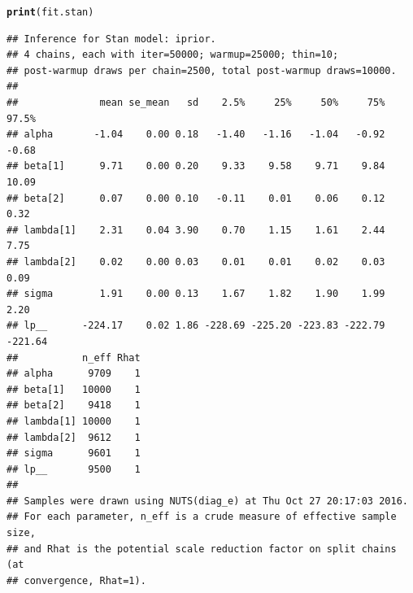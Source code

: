 \documentclass{beamer}\usepackage[]{graphicx}\usepackage[]{color}
\makeatletter
\newcommand{\hlstd}[1]{\textcolor[rgb]{0.345,0.345,0.345}{#1}}%
\newcommand{\hlkwd}[1]{\textcolor[rgb]{0.737,0.353,0.396}{\textbf{#1}}}%
\newenvironment{kframe}{%
 \def\at@end@of@kframe{}%
 \ifinner\ifhmode%
  \def\at@end@of@kframe{\end{minipage}}%
  \begin{minipage}{\columnwidth}%
 \fi\fi%
 \def\FrameCommand##1{\hskip\@totalleftmargin \hskip-\fboxsep
 \colorbox{shadecolor}{##1}\hskip-\fboxsep
     \hskip-\linewidth \hskip-\@totalleftmargin \hskip\columnwidth}%
 \MakeFramed {\advance\hsize-\width
   \@totalleftmargin\z@ \linewidth\hsize
   \@setminipage}}%
 {\par\unskip\endMakeFramed%
 \at@end@of@kframe}
\newenvironment{knitrout}{}{} %
\makeatother
\begin{document}
\newsavebox{\stanres}
\begin{lrbox}{\stanres}
\begin{knitrout}\footnotesize
{}\color{fgcolor}\begin{kframe}
\begin{alltt}
\hlkwd{print}\hlstd{(fit.stan)}
\end{alltt}
\begin{verbatim}
## Inference for Stan model: iprior.
## 4 chains, each with iter=50000; warmup=25000; thin=10; 
## post-warmup draws per chain=2500, total post-warmup draws=10000.
## 
##              mean se_mean   sd    2.5%     25%     50%     75%   97.5%
## alpha       -1.04    0.00 0.18   -1.40   -1.16   -1.04   -0.92   -0.68
## beta[1]      9.71    0.00 0.20    9.33    9.58    9.71    9.84   10.09
## beta[2]      0.07    0.00 0.10   -0.11    0.01    0.06    0.12    0.32
## lambda[1]    2.31    0.04 3.90    0.70    1.15    1.61    2.44    7.75
## lambda[2]    0.02    0.00 0.03    0.01    0.01    0.02    0.03    0.09
## sigma        1.91    0.00 0.13    1.67    1.82    1.90    1.99    2.20
## lp__      -224.17    0.02 1.86 -228.69 -225.20 -223.83 -222.79 -221.64
##           n_eff Rhat
## alpha      9709    1
## beta[1]   10000    1
## beta[2]    9418    1
## lambda[1] 10000    1
## lambda[2]  9612    1
## sigma      9601    1
## lp__       9500    1
## 
## Samples were drawn using NUTS(diag_e) at Thu Oct 27 20:17:03 2016.
## For each parameter, n_eff is a crude measure of effective sample size,
## and Rhat is the potential scale reduction factor on split chains (at 
## convergence, Rhat=1).
\end{verbatim}
\end{kframe}
\end{knitrout}
\end{lrbox}
\end{document}
